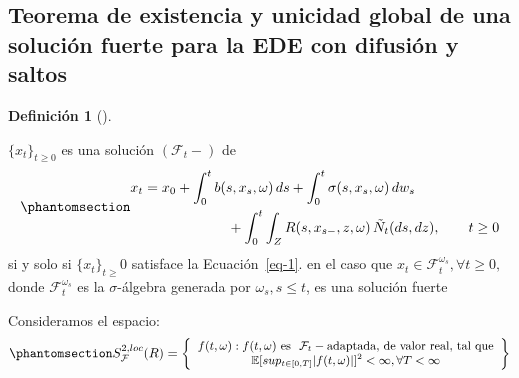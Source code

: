 \documentclass[
  spanish,
  us-letterpaper,
]{scrreprt}
\theoremstyle{plain}
\theoremstyle{plain}
\theoremstyle{definition}
\newtheorem{definition}{Definición}[chapter]
\theoremstyle{remark}
\begin{document}
\subsection{Teorema de existencia y unicidad global de una solución
fuerte para la EDE con difusión y
saltos}\label{teorema-de-existencia-y-unicidad-global-de-una-soluciuxf3n-fuerte-para-la-ede-con-difusiuxf3n-y-saltos}

\begin{definition}[]\protect\hypertarget{def-Solucion_fuerte}{}\label{def-Solucion_fuerte}

\(\{x_t\}_{t\geq0}\) es una solución \((\mathcal{F}_t-)\) de\\
\begin{equation}\protect\phantomsection\label{eq-1}{\begin{split}
x_t = x_0 &+ \int_0^t b(s,x_s,\omega)\,ds 
           + \int_0^t \sigma(s,x_s,\omega)\,dw_s \\
          & \ \ \ \ \ \ \ \ \ \ \ +  \int_0^t\int_Z R(s,x_{s-},z,\omega)\,\tilde{N}_t(ds,dz),
          \qquad t\geq 0
\end{split}}\end{equation} si y solo si \(\{x_t\}_{t\geq}0\) satisface
la Ecuación~\ref{eq-1}. en el caso que
\(x_t\in \mathcal{F}_t^{\omega_s}, \forall t \geq 0,\) donde
\(\mathcal{F}_t^{\omega_s}\) es la \(\sigma\)-álgebra generada por
\(\omega_s, s\leq t\), es una solución fuerte

\end{definition}

Consideramos el espacio:
\begin{equation}\protect\phantomsection\label{eq-2}{\begin{split}
      \small S_{\mathcal{F}}^{2,loc}(R) = \left\lbrace\begin{array}{c}f(t,\omega):f(t,\omega) \text{\ es \ } \mathcal{F}_t- \text{adaptada, de valor real, tal que}
       \\
     \mathbb{E} [sup_{t\in[0,T]} |f(t,\omega)|]^2 < \infty, \forall T < \infty  \end{array}\right\rbrace
\end{split}}\end{equation}
\end{document}
